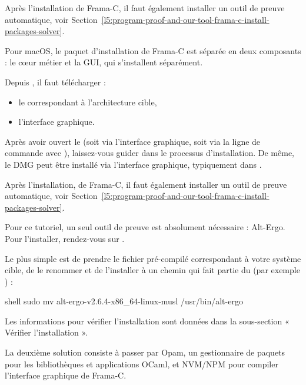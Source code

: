 Après l'installation de Frama-C, il faut également installer un outil de preuve
automatique, voir Section~\ref{l5:program-proof-and-our-tool-frama-c-install-packages-solver}.




Pour macOS, le paquet d'installation de Frama-C est séparée en deux composants :
le c\oe{}ur métier et la GUI, qui s'installent séparément.


Depuis ,
il faut télécharger :
\begin{itemize}
  \item le  correspondant à l'architecture cible,
  \item l'interface graphique.
\end{itemize}


Après avoir ouvert le  (soit via l'interface graphique, soit
via la ligne de commande avec ), laissez-vous guider dans le
processus d'installation. De même, le DMG peut être installé via l'interface
graphique, typiquement dans .

Après l'installation, de Frama-C, il faut également installer un outil de preuve
automatique, voir Section~\ref{l5:program-proof-and-our-tool-frama-c-install-packages-solver}.

\label{l5:program-proof-and-our-tool-frama-c-install-packages-solver}


Pour ce tutoriel, un seul outil de preuve est absolument nécessaire : Alt\nobreakdash-Ergo.
Pour l'installer, rendez-vous sur
.


Le plus simple est de prendre le fichier pré-compilé correspondant à votre
système cible, de le renommer  et de l'installer à un
chemin qui fait partie du  (par exemple ) :
\begin{CodeBlock}{shell}
sudo mv alt-ergo-v2.6.4-x86_64-linux-musl /usr/bin/alt-ergo
\end{CodeBlock}


Les informations pour vérifier l'installation sont données dans la sous-section
« Vérifier l'installation ».




La deuxième solution consiste à passer par Opam, un gestionnaire de paquets
pour les bibliothèques et applications OCaml, et NVM/NPM pour compiler
l'interface graphique de Frama\nobreakdash-C.


